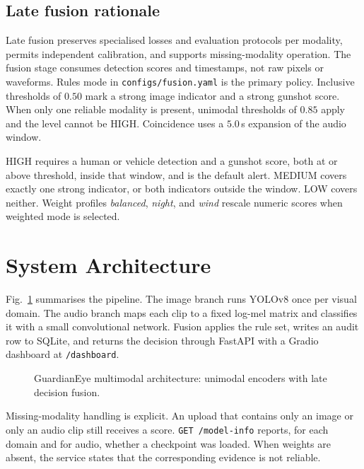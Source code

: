 \documentclass[conference]{IEEEtran}
\begin{document}
\subsection{Late fusion rationale}
Late fusion preserves specialised losses and evaluation protocols per modality, permits independent calibration, and supports missing-modality operation. The fusion stage consumes detection scores and timestamps, not raw pixels or waveforms. Rules mode in \texttt{configs/fusion.yaml} is the primary policy. Inclusive thresholds of $0.50$ mark a strong image indicator and a strong gunshot score. When only one reliable modality is present, unimodal thresholds of $0.85$ apply and the level cannot be HIGH. Coincidence uses a $5.0$\,s expansion of the audio window.

HIGH requires a human or vehicle detection and a gunshot score, both at or above threshold, inside that window, and is the default alert. MEDIUM covers exactly one strong indicator, or both indicators outside the window. LOW covers neither. Weight profiles \emph{balanced}, \emph{night}, and \emph{wind} rescale numeric scores when weighted mode is selected.

\section{System Architecture}
Fig.~\ref{fig:arch} summarises the pipeline. The image branch runs YOLOv8 once per visual domain. The audio branch maps each clip to a fixed log-mel matrix and classifies it with a small convolutional network. Fusion applies the rule set, writes an audit row to SQLite, and returns the decision through FastAPI with a Gradio dashboard at \texttt{/dashboard}.

\begin{figure}[t]
\centering
{}
\caption{GuardianEye multimodal architecture: unimodal encoders with late decision fusion.}
\label{fig:arch}
\end{figure}

Missing-modality handling is explicit. An upload that contains only an image or only an audio clip still receives a score. \texttt{GET /model-info} reports, for each domain and for audio, whether a checkpoint was loaded. When weights are absent, the service states that the corresponding evidence is not reliable.
\end{document}
